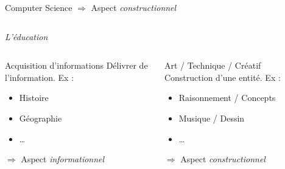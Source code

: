\begin{frame}
\begin{columns}[T]
\begin{column}[l]{.5\textwidth}
\begin{block}{\og Computer Science\fg{}}
        $\Rightarrow$ Aspect \emph{constructionnel}
      \end{block}
    \end{column}
  \end{columns}
  \pause  
  \begin{center}
    \vspace{.4cm}
    \emph{\huge L'éducation}
    \vspace{-.4cm}
  \end{center}
  \begin{columns}[T]
    \begin{column}[l]{.5\textwidth}
      \begin{block}{Acquisition d'informations}
        Délivrer de l'information. Ex :
        \begin{itemize}
          \item Histoire
          \item Géographie
          \item \ldots
        \end{itemize}
        $\Rightarrow$ Aspect \emph{informationnel}
      \end{block}
    \end{column}
    \begin{column}[l]{.5\textwidth}
      \begin{block}{Art / Technique / Créatif}
        Construction d'une entité. Ex :
        \begin{itemize}
          \item Raisonnement / Concepts
          \item Musique / Dessin
          \item \ldots
        \end{itemize}
      $\Rightarrow$ Aspect \emph{constructionnel}
      \end{block}
    \end{column}
  \end{columns}
  
\end{frame}

